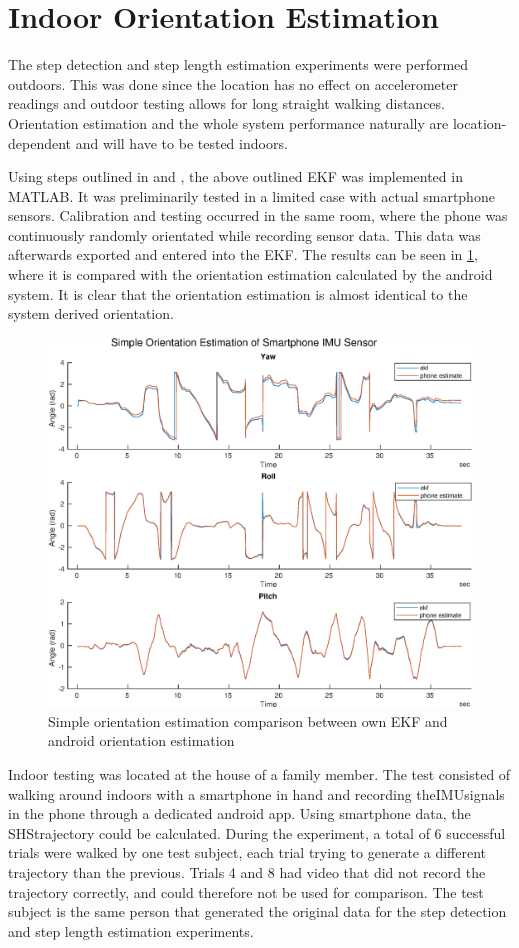 \section{Indoor Orientation Estimation}

The step detection and step length estimation experiments were performed outdoors. This was done since the location has no effect on accelerometer readings and outdoor testing allows for long straight walking distances. Orientation estimation and the whole system performance naturally are location-dependent and will have to be tested indoors. \par

Using steps outlined in \cite{Kok2017} and \cite{Linkoping2013}, the above outlined EKF was implemented in MATLAB. It was preliminarily  tested in a limited case with actual smartphone sensors. Calibration and testing occurred in the same room, where the phone was continuously randomly orientated while recording sensor data. This data was afterwards exported and entered into the EKF. The results can be seen in \cref{fig:simple_stationary_ekf}, where it is compared with the orientation estimation calculated by the android system. It is clear that the orientation estimation is almost identical to the system derived orientation.

\begin{figure}[H]
	\centering
	\includegraphics[width=0.7\linewidth]{images/20201025_2015_simple_stationary_ekf}
	\caption[Simple orientation estimation comparison]{ Simple orientation estimation comparison between own EKF and android orientation estimation}
	\label{fig:simple_stationary_ekf}
\end{figure}

Indoor testing was located at the house of a family member. The test consisted of walking around indoors with a smartphone in hand and recording the\ac{IMU}signals in the phone through a dedicated android app. Using smartphone data, the \ac{SHS}trajectory could be calculated. During the experiment, a total of 6 successful trials were walked by one test subject, each trial trying to generate a different trajectory than the previous. Trials 4 and 8 had video that did not record the trajectory correctly, and could therefore not be used for comparison. The test subject is the same person that generated the original data for the step detection and step length estimation experiments.\par 

